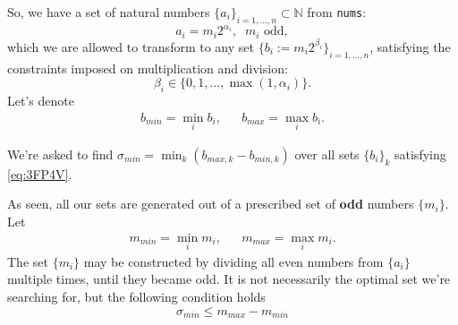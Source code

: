 \documentclass[paper=a4,parskip=half,DIV=12]{leetcode}
\begin{document}
So, we have a set of natural numbers $\{ a_i \}_{i=1,\dots,n} \subset \mathbb{N}$
from \texttt{nums}:
\begin{equation}
  a_i = m_i 2^{\alpha_i}, \;\; m_i \text{ odd},
  \label{eq:DLHTR}
\end{equation}
which we are allowed to transform to any set
$\{ b_i := m_i 2^{\beta_i} \}_{i=1,\dots,n}$,
satisfying the constraints imposed on multiplication and division:
\begin{equation}
 \beta_i \in \{ 0, 1, \dots, \max{(1, \alpha_i)} \}.
 \label{eq:3FP4V}
\end{equation}
Let's denote
\begin{equation}
  \begin{aligned}
    b_{min} = \min_i b_i, && b_{max} = \max_i b_i.
  \end{aligned}
  \label{eq:JB95I}
\end{equation}

We're asked to find $\sigma_{min} = \min_k{(b_{max,k} - b_{min,k})}$ over all
sets $\{ b_i \}_k$ satisfying \eqref{eq:3FP4V}.

As seen, all our sets are generated out of a prescribed set of \textbf{odd}
numbers $\{ m_i \}$. Let
\begin{equation}
  \begin{aligned}
    & m_{min} = \min_i m_i, &
    & m_{max} = \max_i m_i.&
  \end{aligned}
  \label{eq:7M3YV}
\end{equation}
The set $\{m_i\}$ may be constructed by dividing all even numbers from
$\{a_i\}$ multiple times, until they became odd. It is not necessarily
the optimal set we're searching for, but the following condition holds
\begin{equation}
  \sigma_{min} \le m_{max} - m_{min}
  \label{eq:66HJL}
\end{equation}
\end{document}
